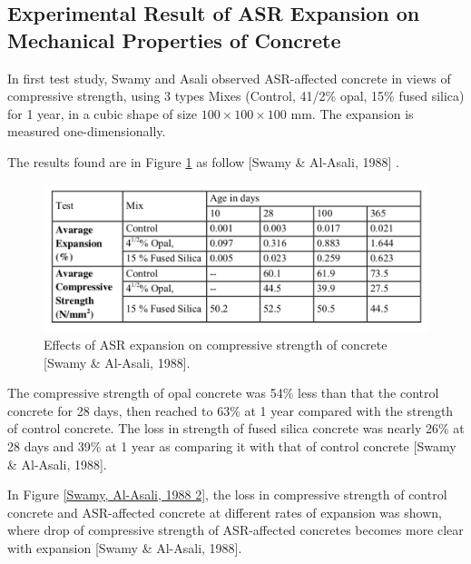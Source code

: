 
\subsection{Experimental Result of ASR Expansion on Mechanical Properties of Concrete}

In first test study, Swamy and Asali\cite{Swamy} observed ASR-affected concrete in views of compressive strength, using 3 types Mixes (Control, 41/2\% opal, 15\% fused silica) for 1 year, in a cubic shape of size $100 \times 100 \times 100$ mm. The expansion is measured one-dimensionally.

The results found are in Figure \ref{Swamy1} as follow [Swamy \& Al-Asali, 1988] .

\begin{figure}[h!]
  \centering
  \includegraphics[width=0.8\linewidth]{Reference/temp3.png}
  \caption{Effects of ASR expansion on compressive strength of concrete [Swamy \& Al-Asali, 1988\cite{Swamy}].}
  \label{Swamy1}
\end{figure}


The compressive strength of opal concrete was 54\% less than that the control concrete for 28 days, then reached to 63\% at 1 year compared with the strength of control concrete. The loss in strength of fused silica concrete was nearly 26\% at 28 days and 39\% at 1 year as comparing it with that of control concrete [Swamy \& Al-Asali, 1988].

In Figure \ref{Swamy, Al-Asali, 1988 2}, the loss in compressive strength of control concrete and ASR-affected concrete at different rates of expansion was shown, where drop of compressive strength of ASR-affected concretes becomes more clear with expansion [Swamy \& Al-Asali, 1988].

